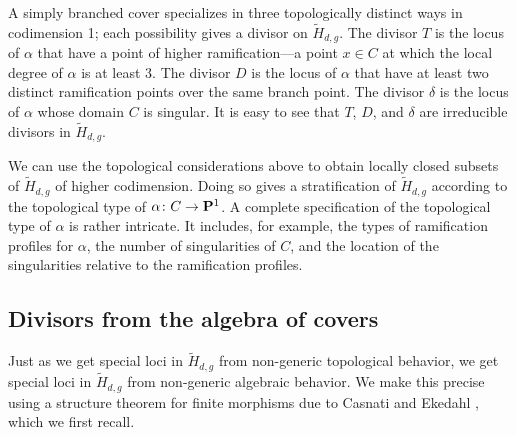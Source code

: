 \documentclass{amsart}
\renewcommand {\P}{{\bf P}}
\providecommand {\from}{{\colon}}
\numberwithin{equation}{section}
\begin{document}
A simply branched cover specializes in three topologically distinct ways in codimension 1; each possibility gives a divisor on $\widetilde H_{d,g}$.
The divisor $T$ is the locus of $\alpha$ that have a point of higher ramification---a point $x \in C$ at which the local degree of $\alpha$ is at least $3$.
The divisor $D$ is the locus of $\alpha$ that have at least two distinct ramification points over the same branch point.
The divisor $\delta$ is the locus of $\alpha$ whose domain $C$ is singular. 
It is easy to see that $T$, $D$, and $\delta$ are irreducible divisors in $\widetilde H_{d,g}$.

\begin{remark}\label{rem:top}
  We can use the topological considerations above to obtain locally closed subsets of $\widetilde H_{d,g}$ of higher codimension.
  Doing so gives a stratification of $\widetilde
  H_{d,g}$ according to the topological type of $\alpha \from C \to
  \P^1$.  A complete specification of the topological type of $\alpha$
  is rather intricate.  It includes, for example, the types of
  ramification profiles for $\alpha$, the number of singularities of
  $C$, and the location of the singularities relative to the
  ramification profiles.
\end{remark}


\subsection{Divisors from the algebra of covers}\label{sec:splitting}
Just as we get special loci in $\widetilde H_{d,g}$ from non-generic topological behavior, we get special loci in $\widetilde H_{d,g}$ from non-generic algebraic behavior.
We make this precise using a structure theorem for finite morphisms due to Casnati and Ekedahl \cite{cas.eke:96}, which we first recall.
\end{document}
